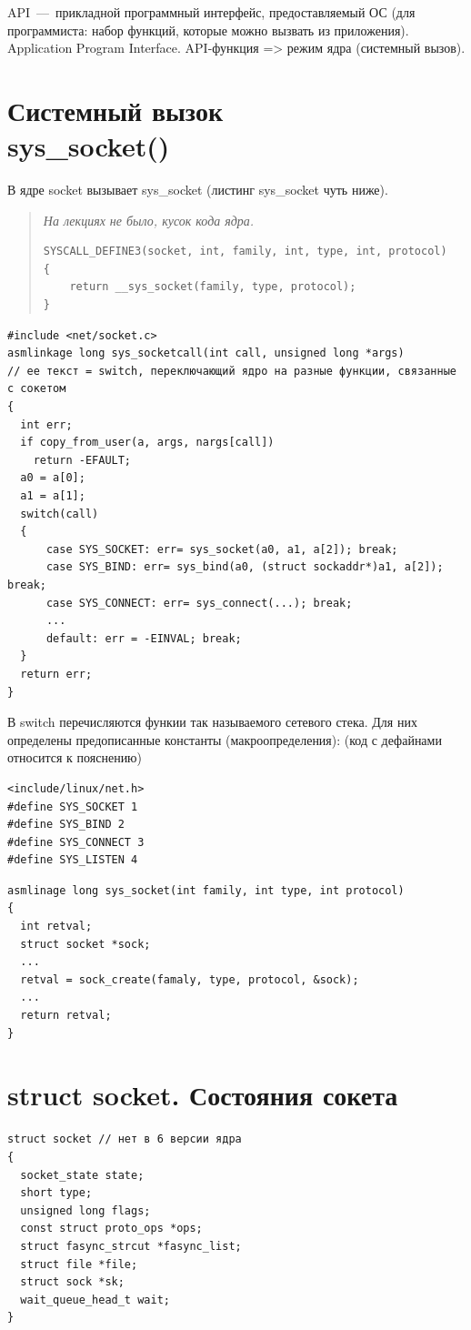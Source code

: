 API~---~прикладной программный интерфейс, предоставляемый ОС (для программиста: набор функций, которые можно вызвать из приложения). Application Program Interface. API-функция => режим ядра (системный вызов).

\section{Системный вызок \\ sys\_socket()}
В ядре socket вызывает sys\_socket (листинг sys\_socket чуть ниже).

\begin{quote}
\textit{На лекциях не было, кусок кода ядра.}

\begin{lstlisting}
SYSCALL_DEFINE3(socket, int, family, int, type, int, protocol)
{
	return __sys_socket(family, type, protocol);
}
\end{lstlisting}
\end{quote}

\begin{lstlisting}
#include <net/socket.c>
asmlinkage long sys_socketcall(int call, unsigned long *args)
// ее текст = switch, переключающий ядро на разные функции, связанные с сокетом
{
  int err;
  if copy_from_user(a, args, nargs[call])
    return -EFAULT;
  a0 = a[0];
  a1 = a[1];
  switch(call)
  {
      case SYS_SOCKET: err= sys_socket(a0, a1, a[2]); break;
      case SYS_BIND: err= sys_bind(a0, (struct sockaddr*)a1, a[2]); break;
      case SYS_CONNECT: err= sys_connect(...); break;
      ...
      default: err = -EINVAL; break;
  }
  return err;
}
\end{lstlisting}
В switch перечисляются функии так называемого сетевого стека. Для них определены предописанные константы (макроопределения): (код с дефайнами относится к пояснению)

\begin{lstlisting}
<include/linux/net.h>
#define SYS_SOCKET 1
#define SYS_BIND 2
#define SYS_CONNECT 3
#define SYS_LISTEN 4
\end{lstlisting}

\begin{lstlisting}
asmlinage long sys_socket(int family, int type, int protocol)
{
  int retval;
  struct socket *sock;
  ...
  retval = sock_create(famaly, type, protocol, &sock);
  ...
  return retval;
}
\end{lstlisting}

\section{struct socket. Состояния сокета}
\begin{lstlisting}
struct socket // нет в 6 версии ядра
{
  socket_state state;
  short type;
  unsigned long flags;
  const struct proto_ops *ops;
  struct fasync_strcut *fasync_list;
  struct file *file;
  struct sock *sk;
  wait_queue_head_t wait;
}
\end{lstlisting}

